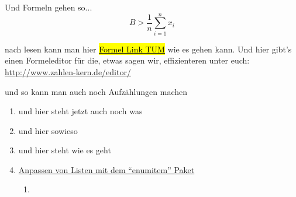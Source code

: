 \newpage

Und Formeln gehen so...
\begin{equation}
		B > \frac{1}{n} \sum_{i=1}^{n}x_{i}
\end{equation}

nach lesen kann man hier \href{http://www.ma.tum.de/foswiki/pub/Ferienkurse/WiSe0809/LaTeX/2_Mathematik_print.pdf}{\hl{Formel Link TUM}}
\autocite{FormelTUM}
wie es gehen kann. Und hier gibt's einen Formeleditor für die, etwas sagen wir, effizienteren unter euch: \href{http://www.zahlen-kern.de/editor/}{http://www.zahlen-kern.de/editor/}
 
und so kann man auch noch Aufzählungen machen

\begin{enumerate}
	\item 
	und hier steht jetzt auch noch was
	\item 
	und hier sowieso
    \item und hier steht wie es geht
    \item
    \href{http://mirrors.ibiblio.org/CTAN/info/translations/enumitem/de/enumitem-de.pdf}{Anpassen von Listen mit dem \enquote{enumitem} Paket}
		\begin{enumerate}
			\item 
		\end{enumerate}
\end{enumerate}






\autocite{koma-script}
